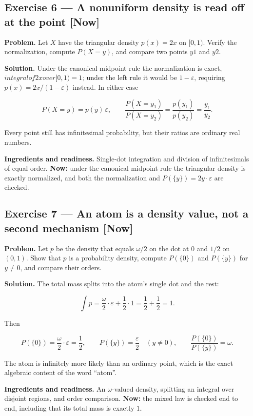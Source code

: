 \documentclass[11pt]{article}
\newcommand{\eps}{\varepsilon}
\renewcommand{\epsilon}{\varepsilon}
\begin{document}
\subsection*{Exercise 6 --- A nonuniform density is read off at the point \hfill \normalfont\small[Now]}

\textbf{Problem.} Let $X$ have the triangular density $p(x) = 2x$ on $[0,1)$.
Verify the normalization, compute $P(X = y)$, and compare two points $y1$ and
$y2$.

\textbf{Solution.} Under the canonical midpoint rule the normalization is exact,
$integral of 2x over [0,1) = 1$; under the left rule it would be $1 - \eps$,
requiring $p(x) = 2x/(1-\eps)$ instead. In either case

\[
P(X=y)=p(y)\,\epsilon,
\qquad
\frac{P(X=y_1)}{P(X=y_2)}=\frac{p(y_1)}{p(y_2)}=\frac{y_1}{y_2}.
\]

Every point still has infinitesimal probability, but their ratios are ordinary
real numbers.

\textbf{Ingredients and readiness.} Single-dot integration and division of
infinitesimals of equal order. \textbf{Now:} under the canonical midpoint rule the
triangular density is exactly normalized, and both the normalization and
$P(\{y\}) = 2y\cdot \eps$ are checked.


\subsection*{Exercise 7 --- An atom is a density value, not a second mechanism \hfill \normalfont\small[Now]}

\textbf{Problem.} Let $p$ be the density that equals $\omega/2$ on the dot at $0$
and $1/2$ on $(0,1)$. Show that $p$ is a probability density, compute
$P(\{0\})$ and $P(\{y\})$ for $y \neq  0$, and compare their orders.

\textbf{Solution.} The total mass splits into the atom's single dot and the rest:

\[
\int p=\frac\omega2\cdot\epsilon+\frac12\cdot 1=\frac12+\frac12=1 .
\]

Then

\[
P(\{0\})=\frac\omega2\cdot\epsilon=\frac12,
\qquad
P(\{y\})=\frac\epsilon2 \quad (y\neq0),
\qquad
\frac{P(\{0\})}{P(\{y\})}=\omega .
\]

The atom is infinitely more likely than an ordinary point, which is the exact
algebraic content of the word ``atom''.

\textbf{Ingredients and readiness.} An $\omega$-valued density, splitting an
integral over disjoint regions, and order comparison. \textbf{Now:} the mixed law is
checked end to end, including that its total mass is exactly $1$.
\end{document}
